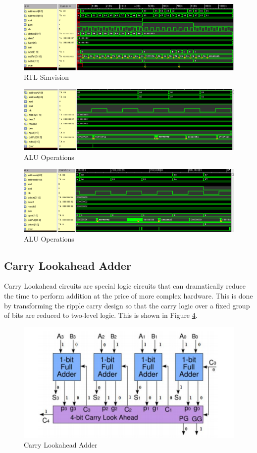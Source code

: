 \documentclass[12pt]{article}
\begin{document}
\begin{figure}[H]
\centering
\includegraphics[width=1\linewidth]{../CRA/test-test}
\caption{RTL Simvision}
\label{fig:test-test}
\end{figure}


\begin{figure}[H]
\centering
\includegraphics[width=1\linewidth]{../CRA/alu1-test}
\caption{ALU Operations}
\label{fig:alu1}
\end{figure}

\begin{figure}[H]
\centering
\includegraphics[width=1\linewidth]{../CRA/alu2-test}
\caption{ALU Operations}
\label{fig:alu2}
\end{figure}

\subsection{Carry Lookahead Adder}
Carry Lookahead circuits are special logic circuits that can dramatically reduce the time to perform addition at the price of more complex hardware. This is done by transforming the ripple carry design so that the carry logic over a fixed group of bits are reduced to two-level logic. This is shown in Figure \ref{fig:carry-lookahead}.
\begin{figure}[H]
\centering
\includegraphics[width=0.7\linewidth]{carry-lookahead}
\caption{Carry Lookahead Adder}
\label{fig:carry-lookahead}
\end{figure}
\end{document}
